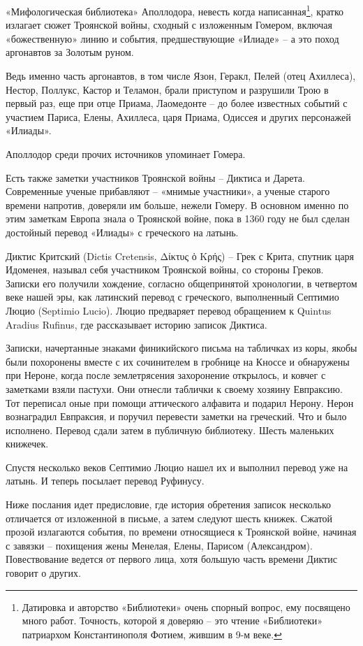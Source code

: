 «Мифологическая библиотека» Аполлодора, невесть когда написанная\footnote{Датировка и авторство «Библиотеки» очень спорный вопрос, ему посвящено много работ. Точность, которой я доверяю – это чтение «Библиотеки» патриархом Константинополя Фотием, жившим в 9-м веке.}, кратко излагает сюжет Троянской войны, сходный с изложенным Гомером, включая «божественную» линию и события, предшествующие «Илиаде» – а это поход аргонавтов за Золотым руном.

Ведь именно часть аргонавтов, в том числе Язон, Геракл, Пелей (отец Ахиллеса), Нестор, Поллукс, Кастор и Теламон, брали приступом и разрушили Трою в первый раз, еще при отце Приама, Лаомедонте – до более известных событий с участием Париса, Елены, Ахиллеса, царя Приама, Одиссея и других персонажей «Илиады».

Аполлодор среди прочих источников упоминает Гомера.

Есть также заметки участников Троянской войны – Диктиса и Дарета. Современные ученые прибавляют – «мнимые участники», а ученые старого времени напротив, доверяли им больше, нежели Гомеру. В основном именно по этим заметкам Европа знала о Троянской войне, пока в 1360 году не был сделан достойный перевод «Илиады» с греческого на латынь.

Диктис Критский (Dictis Cretensis, Δίκτυς ὁ Κρής) – Грек с Крита, спутник царя Идоменея, называл себя участником Троянской войны, со стороны Греков. Записки его получили хождение, согласно общепринятой хронологии, в четвертом веке нашей эры, как латинский перевод с греческого, выполненный Септимио Люцио (Septimio Lucio). Люцио предваряет перевод обращением к Quintus Aradius Rufinus, где рассказывает историю записок Диктиса.

Записки, начертанные знаками финикийского письма на табличках из коры, якобы были похоронены вместе с их сочинителем в гробнице на Кноссе и обнаружены при Нероне, когда после землетрясения захоронение открылось, и ковчег с заметками взяли пастухи. Они отнесли таблички к своему хозяину Евпраксию. Тот переписал оные при помощи аттического алфавита и подарил Нерону. Нерон вознаградил Евпраксия, и поручил перевести заметки на греческий. Что и было исполнено. Перевод сдали затем в публичную библиотеку. Шесть маленьких книжечек.

Спустя несколько веков Септимио Люцио нашел их и выполнил перевод уже на латынь. И теперь посылает перевод Руфинусу.

Ниже послания идет предисловие, где история обретения записок несколько отличается от изложенной в письме, а затем следуют шесть книжек. Сжатой прозой излагаются события, по времени относящиеся к Троянской войне, начиная с завязки – похищения жены Менелая, Елены, Парисом (Александром). Повествование ведется от первого лица, хотя большую часть времени Диктис говорит о других. 

